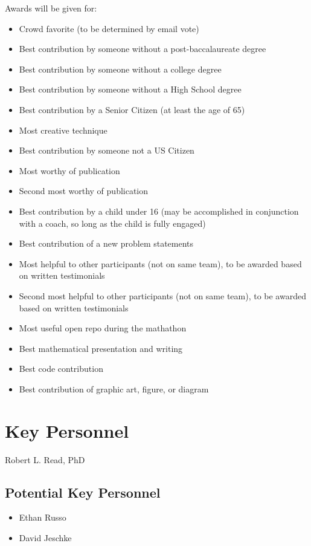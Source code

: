 \documentclass[11pt]{article}
\begin{document}
Awards will be given for:
\begin{itemize}
\item Crowd favorite (to be determined by email vote)
\item Best contribution by someone without a post-baccalaureate degree
\item Best contribution by someone without a college degree
\item Best contribution by someone without a High School degree
\item Best contribution by a Senior Citizen (at least the age of 65)
\item Most creative technique
\item Best contribution by someone not a US Citizen
\item Most worthy of publication
\item Second most worthy of publication
\item Best contribution by a child under 16 (may be accomplished in conjunction with a coach, so long as the child is fully engaged)
\item Best contribution of a new problem statements
\item Most helpful to other participants (not on same team), to be awarded based on written testimonials
\item Second most helpful to other participants (not on same team), to be awarded based on written testimonials
\item Most useful open repo during the mathathon
\item Best mathematical presentation and writing
\item Best code contribution
\item Best contribution of graphic art, figure, or diagram
\end{itemize}

\section{Key Personnel}

Robert L. Read, PhD

\subsection{Potential Key Personnel}

\begin{itemize}
\item Ethan Russo
\item David Jeschke
\end{itemize}




\end{document}
